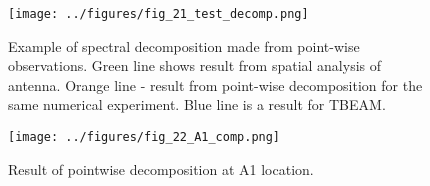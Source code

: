 \documentclass[12pt]{article}
\begin{document}
\begin{figure}
	\centering
	\texttt{[image: ../figures/fig\_21\_test\_decomp.png]}
	\caption{Example of spectral decomposition made from point-wise observations. Green line shows 
		result from spatial analysis of antenna. Orange line - result from point-wise decomposition 
		for 
		the same numerical experiment. Blue line is a result for TBEAM.}
	\label{C3.fig:test_spectra}
\end{figure}


\begin{figure}
	\centering
	\texttt{[image: ../figures/fig\_22\_A1\_comp.png]}
	\caption{Result of pointwise decomposition at A1 location. }
	\label{C3.fig:dcmp_A1}
\end{figure}


%




\end{document}
